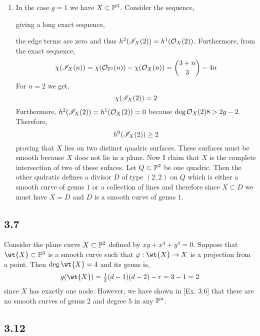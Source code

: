 \documentclass[12pt]{article}
\begin{document}
\begin{enumerate}
\item In the case $g = 1$ we have $X \subset \P^3$. Consider the sequence,
\begin{center}
\end{center}
giving a long exact sequence,
\begin{center}
\end{center}
the edge terms are zero and thus $h^2(\I_X(2)) = h^1(\struct{X}(2))$. Furthermore, from the exact sequence,
\[ \chi(\I_X(n)) = \chi(\struct{\P^3}(n)) - \chi(\struct{X}(n)) = { 3 + n \choose 3 } - 4 n \]
For $n = 2$ we get,
\[ \chi(\I_X(2)) = 2 \]
Furthermore, $h^2(\I_X(2)) = h^1(\struct{X}(2)) = 0$ because $\deg{\struct{X}(2)} 8 > 2 g - 2$. Therefore, 
\[ h^0(\I_X(2)) \ge 2 \]
proving that $X$ lies on two distinct quadric surfaces. These surfaces must be smooth because $X$ does not lie in a plane. Now I claim that $X$ is the complete intersection of two of these sufaces. Let $Q \subset \P^2$ be one quadric. Then the other qudratic defines a divisor $D$ of type $(2,2)$ on $Q$ which is either a smooth curve of genus $1$ or a collection of lines and therefore since $X \subset D$ we must have $X = D$ and $D$ is a smooth curve of genus $1$. 
\end{enumerate}

\subsection{3.7}

Consider the plane curve $X \subset \P^2$ defined by $xy + x^4 + y^4 = 0$. Suppose that $\wt{X} \subset \P^3$ is a smooth curve such that $\varphi : \wt{X} \to X$ is a projection from a point. Then $\deg{\wt{X}} = 4$ and its genus is,
\[ g(\wt{X}) = \tfrac{1}{2}(d - 1)(d - 2) - r = 3 - 1 = 2 \]
since $X$ has exactly one node. However, we have shown in [Ex. 3.6] that there are no smooth curves of genus $2$ and degree $5$ in any $\P^n$. 


\subsection{3.12}
\end{document}

